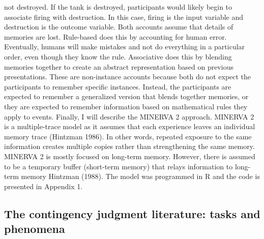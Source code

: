 \documentclass[
  english,
  man,floatsintext]{apa6}
\begin{document}
not destroyed. If the tank is destroyed, participants would likely begin to associate firing with destruction. In this case, firing is the input variable and destruction is the outcome variable. Both accounts assume that details of memories are lost. Rule-based does this by accounting for human error. Eventually, humans will make mistakes and not do everything in a particular order, even though they know the rule. Associative does this by blending memories together to create an abstract representation based on previous presentations. These are non-instance accounts because both do not expect the participants to remember specific instances. Instead, the participants are expected to remember a generalized version that blends together memories, or they are expected to remember information based on mathematical rules they apply to events. Finally, I will describe the MINERVA 2 approach. MINERVA 2 is a multiple-trace model as it assumes that each experience leaves an individual memory trace (Hintzman 1986). In other words, repeated exposure to the same information creates multiple copies rather than strengthening the same memory. MINERVA 2 is mostly focused on long-term memory. However, there is assumed to be a temporary buffer (short-term memory) that relays information to long-term memory Hintzman (1988). The model was programmed in R and the code is presented in Appendix 1.

\hypertarget{the-contingency-judgment-literature-tasks-and-phenomena}{%
\subsection{The contingency judgment literature: tasks and phenomena}\label{the-contingency-judgment-literature-tasks-and-phenomena}}
\end{document}
